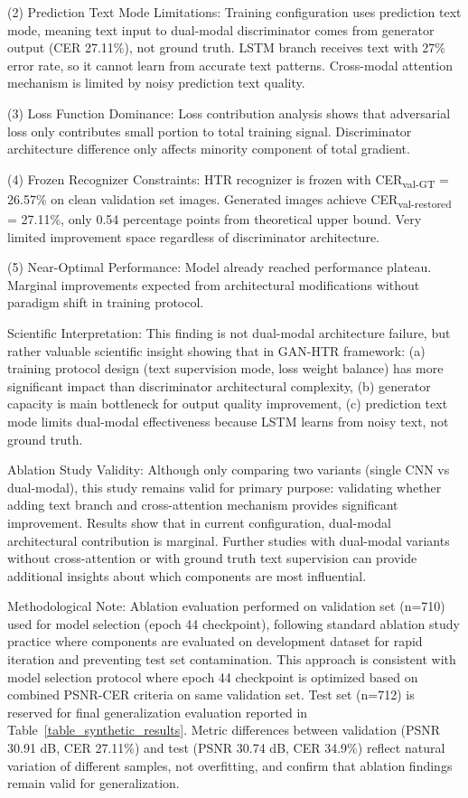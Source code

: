 \documentclass[journal]{IEEEtran}
\begin{document}
(2) Prediction Text Mode Limitations: Training configuration uses prediction text mode, meaning text input to dual-modal discriminator comes from generator output (CER 27.11\%), not ground truth. LSTM branch receives text with 27\% error rate, so it cannot learn from accurate text patterns. Cross-modal attention mechanism is limited by noisy prediction text quality.

(3) Loss Function Dominance: Loss contribution analysis shows that adversarial loss only contributes small portion to total training signal. Discriminator architecture difference only affects minority component of total gradient.

(4) Frozen Recognizer Constraints: HTR recognizer is frozen with CER\textsubscript{val-GT} = 26.57\% on clean validation set images. Generated images achieve CER\textsubscript{val-restored} = 27.11\%, only 0.54 percentage points from theoretical upper bound. Very limited improvement space regardless of discriminator architecture.

(5) Near-Optimal Performance: Model already reached performance plateau. Marginal improvements expected from architectural modifications without paradigm shift in training protocol.

Scientific Interpretation: This finding is not dual-modal architecture failure, but rather valuable scientific insight showing that in GAN-HTR framework: (a) training protocol design (text supervision mode, loss weight balance) has more significant impact than discriminator architectural complexity, (b) generator capacity is main bottleneck for output quality improvement, (c) prediction text mode limits dual-modal effectiveness because LSTM learns from noisy text, not ground truth.

Ablation Study Validity: Although only comparing two variants (single CNN vs dual-modal), this study remains valid for primary purpose: validating whether adding text branch and cross-attention mechanism provides significant improvement. Results show that in current configuration, dual-modal architectural contribution is marginal. Further studies with dual-modal variants without cross-attention or with ground truth text supervision can provide additional insights about which components are most influential.

Methodological Note: Ablation evaluation performed on validation set (n=710) used for model selection (epoch 44 checkpoint), following standard ablation study practice where components are evaluated on development dataset for rapid iteration and preventing test set contamination. This approach is consistent with model selection protocol where epoch 44 checkpoint is optimized based on combined PSNR-CER criteria on same validation set. Test set (n=712) is reserved for final generalization evaluation reported in Table~\ref{table_synthetic_results}. Metric differences between validation (PSNR 30.91 dB, CER 27.11\%) and test (PSNR 30.74 dB, CER 34.9\%) reflect natural variation of different samples, not overfitting, and confirm that ablation findings remain valid for generalization.
\end{document}
